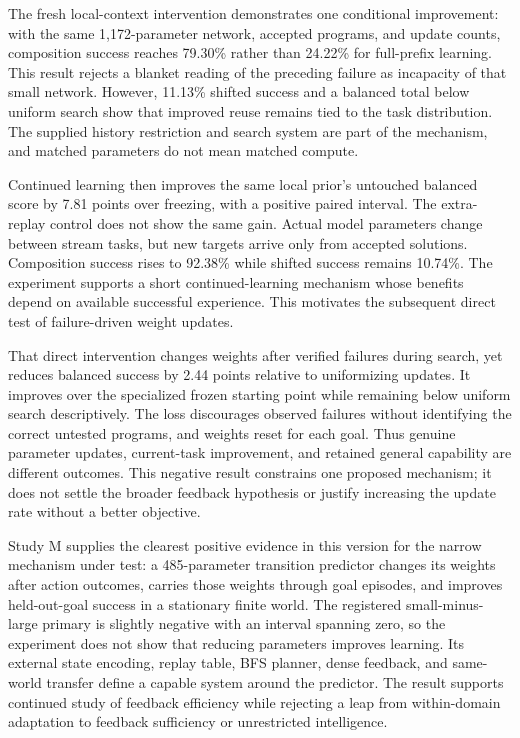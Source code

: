 \documentclass[11pt]{article}
\begin{document}
The fresh local-context intervention demonstrates one conditional improvement:
with the same 1,172-parameter network, accepted programs, and update counts,
composition success reaches 79.30\% rather than 24.22\% for full-prefix
learning. This result rejects a blanket reading of the preceding failure as
incapacity of that small network. However, 11.13\% shifted success and a
balanced total below uniform search show that improved reuse remains tied
to the task distribution. The supplied history restriction and search system
are part of the mechanism, and matched parameters do not mean matched compute.

Continued learning then improves the same local prior's untouched balanced
score by 7.81 points over freezing, with a positive paired interval. The
extra-replay control does not show the same gain. Actual model parameters
change between stream tasks, but new targets arrive only from accepted
solutions. Composition success rises to 92.38\% while shifted success remains
10.74\%. The experiment supports a short continued-learning mechanism whose
benefits depend on available successful experience. This motivates the
subsequent direct test of failure-driven weight updates.

That direct intervention changes weights after verified failures during
search, yet reduces balanced success by 2.44 points relative to uniformizing
updates. It improves over the specialized frozen starting point while
remaining below uniform search descriptively. The loss discourages observed
failures without identifying the correct untested programs, and weights reset
for each goal. Thus genuine parameter updates, current-task improvement, and
retained general capability are different outcomes. This negative result
constrains one proposed mechanism; it does not settle the broader feedback
hypothesis or justify increasing the update rate without a better objective.

Study M supplies the clearest positive evidence in this version for the
narrow mechanism under test: a 485-parameter transition predictor changes its
weights after action outcomes, carries those weights through goal episodes, and
improves held-out-goal success in a stationary finite world. The registered
small-minus-large primary is slightly negative with an interval spanning zero,
so the experiment does not show that reducing parameters improves learning.
Its external state encoding, replay table, BFS planner, dense feedback, and
same-world transfer define a capable system around the predictor. The result
supports continued study of feedback efficiency while rejecting a leap from
within-domain adaptation to feedback sufficiency or unrestricted intelligence.
\end{document}
